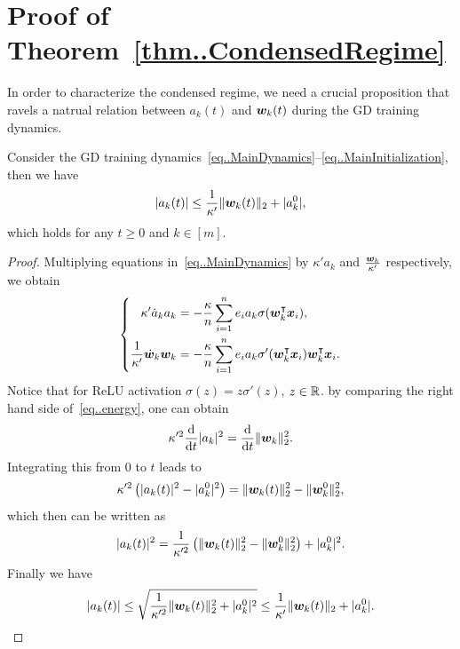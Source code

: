 \documentclass{article}
\begin{document}
\section{Proof of Theorem~\ref{thm..CondensedRegime}}
In order to characterize the condensed regime, we need a crucial proposition that ravels a natrual relation between $a_k(t)$ and $\bm{w}_k(t)$ during the GD training dynamics.
\begin{prop}\label{prop..a-w-est}
    Consider the GD training dynamics~\eqref{eq..MainDynamics}--\eqref{eq..MainInitialization}, then we have
    \begin{equation}
        \lvert a_k(t)\rvert\leq \frac{1}{\kappa'}\lVert\bm{w}_k(t)\rVert_2+\lvert a_k^0\rvert,
    \end{equation}
    which holds for any $t\geq 0$ and $k\in[m]$.
\end{prop}
\begin{proof}
    Multiplying equations in~\eqref{eq..MainDynamics} by $\kappa'a_k$ and $\frac{\bm{w}_k}{\kappa'}$ respectively, we obtain
    \begin{equation}\label{eq..energy}
        \left \{
        \begin{aligned}
            \kappa'\dot{a}_k a_k              & = -\frac{\kappa}{n}\sum_{i=1}^{n}e_i a_k\sigma(\bm{w}_k^\intercal\bm{x}_i),              \\
            \frac{1}{\kappa'}\dot{\bm{w}}_k\bm{w}_k & = -\frac{\kappa}{n}\sum_{i=1}^n e_i a_k\sigma'(\bm{w}_k^\intercal\bm{x}_i)\bm{w}_k^\intercal\bm{x}_i.
        \end{aligned}
        \right.
    \end{equation}
    Notice that for ReLU activation $\sigma(z)=z\sigma'(z)$, $z\in\mathbb{R}$.
    by comparing the right hand side of~\eqref{eq..energy}, one can obtain
    \begin{equation*}
        \kappa'^2\frac{\mathrm{d}}{\mathrm{d} t}\lvert a_k\rvert^2 = \frac{\mathrm{d}}{\mathrm{d} t}\lVert\bm{w}_k\rVert^2_2.
    \end{equation*}
    Integrating this from $0$ to $t$ leads to
    \begin{equation*}
        \kappa'^2\left(\lvert a_k(t)\rvert^2-\lvert a_k^0\rvert^2\right) = \lVert\bm{w}_k(t)\rVert^2_2-\lVert\bm{w}_k^0\rVert^2_2,
    \end{equation*}
    which then can be written as
    \begin{equation}
        \lvert a_k(t)\rvert^2 = \frac{1}{\kappa'^2}\left(\lVert\bm{w}_k(t)\rVert^2_2-\lVert\bm{w}_k^0\rVert^2_2\right) + \lvert a_k^0\rvert^2.
    \end{equation}
    Finally we have
    \begin{equation*}
        \lvert a_k(t)\rvert\leq\sqrt{\frac{1}{\kappa'^2}\lVert\bm{w}_k(t)\rVert^2_2+\lvert a_k^0\rvert^2}
        \leq
        \frac{1}{\kappa'}\lVert\bm{w}_k(t)\rVert_2+\lvert a_k^0\rvert.
    \end{equation*}
\end{proof}
\end{document}
